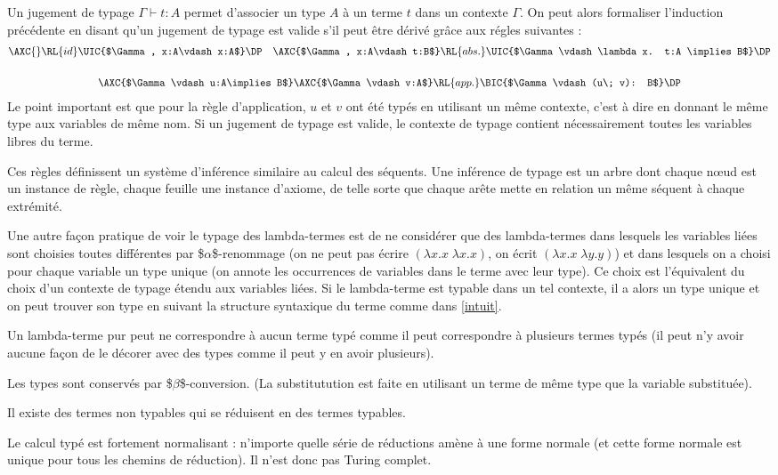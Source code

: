 \documentclass[11pt, a4paper]{article}
\begin{document}
\begin{multicols}{2}
Un jugement de typage \(\Gamma \vdash t: A\) permet d'associer un type
\(A\) à un terme \(t\) dans un contexte \(\Gamma\). On peut alors formaliser
l'induction précédente en disant qu'un jugement de typage est valide
s'il peut être dérivé grâce aux régles suivantes :
\begin{gather*}
  \AXC{}\RL{id}
\UIC{$\Gamma, x:A\vdash x:A$}
\DP\quad
\AXC{$\Gamma, x:A\vdash t:B$}\RL{abs.}
\UIC{$\Gamma \vdash \lambda x. t:A \implies B$}
\DP\\[0.5cm]
\AXC{$\Gamma\vdash u:A\implies B$}
\AXC{$\Gamma\vdash v:A$}\RL{app.}
\BIC{$\Gamma \vdash (u\; v): B$}
\DP
\end{gather*}
Le point important est que pour la règle d'application, \(u\) et \(v\) ont
été typés en utilisant un même contexte, c'est à dire en donnant le
même type aux variables de même nom. Si un jugement de typage est
valide, le contexte de typage contient nécessairement toutes les
variables libres du terme.

Ces règles définissent un système d'inférence similaire au calcul des
séquents. Une inférence de typage est un arbre dont chaque nœud est
un instance de règle, chaque feuille une instance d'axiome, de telle
sorte que chaque arête mette en relation un même séquent à chaque
extrémité.

Une autre façon pratique de voir le typage des lambda-termes est de ne
considérer que des lambda-termes dans lesquels les variables liées
sont choisies toutes différentes par \$\(\alpha\)\$-renommage (on ne peut
pas écrire \((\lambda x. x\; \lambda x. x)\), on écrit \((\lambda x. x\;
\lambda y. y)\)) et dans lesquels on a choisi pour chaque variable un
type unique (on annote les occurrences de variables dans le terme avec
leur type). Ce choix est l'équivalent du choix d'un contexte de typage
étendu aux variables liées. Si le lambda-terme est typable dans un tel contexte,
il a alors un type unique et on peut trouver son type en suivant la
structure syntaxique du terme comme dans \ref{intuit}.

Un lambda-terme pur peut ne correspondre à aucun terme typé comme il
peut correspondre à plusieurs termes typés (il peut n'y avoir aucune
façon de le décorer avec des types comme il peut y en avoir
plusieurs).


Les types sont conservés par \$\(\beta\)\$-conversion. (La substitutution est
faite en utilisant un terme de même type que la variable substituée).

Il existe des termes non typables qui se réduisent en des
termes typables.

Le calcul typé est fortement normalisant : n'importe quelle série de
réductions amène à une forme normale (et cette forme normale est unique
pour tous les chemins de réduction). Il n'est donc pas Turing complet.

\end{multicols}
\end{document}
